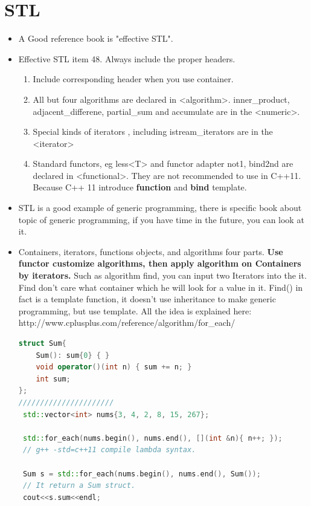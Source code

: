 \documentclass[a4paper,12pt,twoside]{book}
\begin{document}
\section{STL}
\begin{itemize}
\item A Good reference book is "effective STL".
\item Effective STL item 48. Always include the proper headers.
\begin{enumerate}
\item Include corresponding header when you use container.
\item All but four algorithms are declared in <algorithm>. inner\_product, adjacent\_differene, partial\_sum and accumulate are in the <numeric>.
\item Special kinds of iterators , including istream\_iterators are in the <iterator>
\item Standard functors, eg less<T> and functor adapter not1, bind2nd are declared in <functional>. They are not recommended to use in C++11. Because C++ 11 introduce \textbf{function} and \textbf{bind} template.
\end{enumerate}

\item STL is a good example  of generic programming,  there is specific book about topic of generic programming, if you have time in the future, you can look at it.
\item Containers, iterators, functions objects, and algorithms four parts. \textbf{Use functor customize algorithms, then apply algorithm on Containers by iterators.} Such as algorithm find, you can input two Iterators into the it.  Find don't care what container which he will look for a value in it.  Find() in fact is a template function, it doesn't use inheritance to make generic programming, but use template.   All the idea is explained here:
http://www.cplusplus.com/reference/algorithm/for\_each/

\begin{lstlisting}[frame=single, language=c++]
struct Sum{
    Sum(): sum{0} { }
    void operator()(int n) { sum += n; }
    int sum;
};
//////////////////////
 std::vector<int> nums{3, 4, 2, 8, 15, 267};

 std::for_each(nums.begin(), nums.end(), [](int &n){ n++; });
 // g++ -std=c++11 compile lambda syntax.

 Sum s = std::for_each(nums.begin(), nums.end(), Sum());
 // It return a Sum struct.
 cout<<s.sum<<endl;
\end{lstlisting}

\end{itemize}
\end{document}
